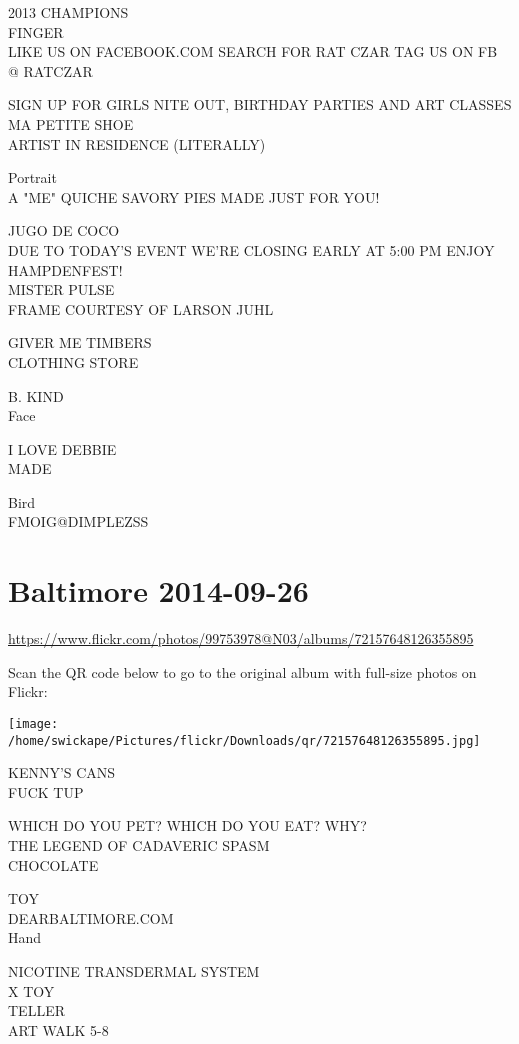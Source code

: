 \documentclass[10pt,letterpaper]{article}
\begin{document}
2013 CHAMPIONS\\
FINGER\\
LIKE US ON FACEBOOK.COM SEARCH FOR RAT CZAR TAG US ON FB @ RATCZAR

SIGN UP FOR GIRLS NITE OUT, BIRTHDAY PARTIES AND ART CLASSES\\
MA PETITE SHOE\\
ARTIST IN RESIDENCE (LITERALLY)

Portrait\\
A "ME" QUICHE SAVORY PIES MADE JUST FOR YOU!

JUGO DE COCO\\
DUE TO TODAY'S EVENT WE'RE CLOSING EARLY AT 5:00 PM ENJOY HAMPDENFEST!\\
MISTER PULSE\\
FRAME COURTESY OF LARSON JUHL

GIVER ME TIMBERS\\
CLOTHING STORE

B. KIND\\
Face

I LOVE DEBBIE\\
MADE

Bird\\
FMOIG@DIMPLEZSS
\pagebreak

\section*{Baltimore 2014-09-26}

\url{https://www.flickr.com/photos/99753978@N03/albums/72157648126355895}

Scan the QR code below to go to the original album with full-size photos on Flickr:

\texttt{[image: /home/swickape/Pictures/flickr/Downloads/qr/72157648126355895.jpg]}
\pagebreak

KENNY'S CANS\\
FUCK TUP

WHICH DO YOU PET?  WHICH DO YOU EAT?  WHY?\\
THE LEGEND OF CADAVERIC SPASM\\
CHOCOLATE

TOY\\
DEARBALTIMORE.COM\\
Hand

NICOTINE TRANSDERMAL SYSTEM\\
X TOY\\
TELLER\\
ART WALK 5{-}8
\end{document}
